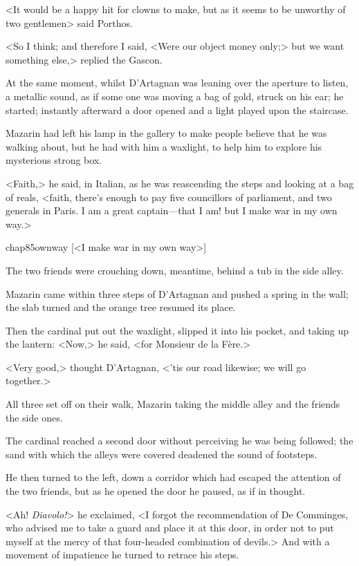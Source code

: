 <It would be a happy hit for clowns to make, but as it seems to be unworthy of two gentlemen\longdash> said Porthos.

<So I think; and therefore I said, <Were our object money only;> but we want something else,> replied the Gascon.

At the same moment, whilst D'Artagnan was leaning over the aperture to listen, a metallic sound, as if some one was moving a bag of gold, struck on his ear; he started; instantly afterward a door opened and a light played upon the staircase.

Mazarin had left his lamp in the gallery to make people believe that he was walking about, but he had with him a waxlight, to help him to explore his mysterious strong box.

<Faith,> he said, in Italian, as he was reascending the steps and looking at a bag of reals, <faith, there's enough to pay five councillors of parliament, and two generals in Paris. I am a great captain—that I am! but I make war in my own way.>

\begin{colorbigpic}
	[\basicscale] 
	{chap85ownway}
	[<I make war in my own way>]
\end{colorbigpic}

The two friends were crouching down, meantime, behind a tub in the side alley.

Mazarin came within three steps of D'Artagnan and pushed a spring in the wall; the slab turned and the orange tree resumed its place.

Then the cardinal put out the waxlight, slipped it into his pocket, and taking up the lantern: <Now,> he said, <for Monsieur de la Fère.>

<Very good,> thought D'Artagnan, <'tis our road likewise; we will go together.>

All three set off on their walk, Mazarin taking the middle alley and the friends the side ones.

The cardinal reached a second door without perceiving he was being followed; the sand with which the alleys were covered deadened the sound of footsteps.

He then turned to the left, down a corridor which had escaped the attention of the two friends, but as he opened the door he paused, as if in thought.

<Ah! \textit{Diavolo!}> he exclaimed, <I forgot the recommendation of De Comminges, who advised me to take a guard and place it at this door, in order not to put myself at the mercy of that four-headed combination of devils.> And with a movement of impatience he turned to retrace his steps.

